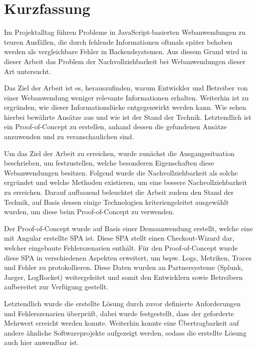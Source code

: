 \section*{\thispagestyle{empty}Kurzfassung}
	
Im Projektalltag führen Probleme in JavaScript-basierten Webanwendungen zu teuren Ausfällen, die durch fehlende Informationen oftmals später behoben werden als vergleichbare Fehler in Backendsystemen. Aus diesem Grund wird in dieser Arbeit das Problem der Nachvollziehbarkeit bei Webanwendungen dieser Art untersucht.
	
Das Ziel der Arbeit ist es, herauszufinden, warum Entwickler und Betreiber von einer Webanwendung weniger relevante Informationen erhalten. Weiterhin ist zu ergründen, wie dieser Informationslücke entgegenwirkt werden kann. Wie sehen hierbei bewährte Ansätze aus und wie ist der Stand der Technik. Letztendlich ist ein Proof-of-Concept zu erstellen, anhand dessen die gefundenen Ansätze anzuwenden und zu veranschaulichen sind.

Um das Ziel der Arbeit zu erreichen, wurde zunächst die Ausgangssituation beschrieben, um festzustellen, welche besonderen Eigenschaften diese Webanwendungen besitzen. Folgend wurde die Nachvollziehbarkeit als solche ergründet und welche Methoden existieren, um eine bessere Nachvollziehbarkeit zu erreichen. Darauf aufbauend beleuchtet die Arbeit zudem den Stand der Technik, auf Basis dessen einige Technologien kriteriengeleitet ausgewählt wurden, um diese beim Proof-of-Concept zu verwenden.

Der Proof-of-Concept wurde auf Basis einer Demoanwendung erstellt, welche eine mit Angular erstellte SPA ist. Diese SPA stellt einen Checkout-Wizard dar, welcher eingebaute Fehlerszenarien enthält. Für den Proof-of-Concept wurde diese SPA in verschiedenen Aspekten erweitert, um bspw. Logs, Metriken, Traces und Fehler zu protokollieren. Diese Daten wurden an Partnersysteme (Splunk, Jaeger, LogRocket) weitergeleitet und somit den Entwicklern sowie Betreibern aufbereitet zur Verfügung gestellt.

Letztendlich wurde die erstellte Lösung durch zuvor definierte Anforderungen und Fehlerszenarien überprüft, dabei wurde festgestellt, dass der geforderte Mehrwert erreicht werden konnte. Weiterhin konnte eine Übertragbarkeit auf andere ähnliche Softwareprojekte aufgezeigt werden, sodass die erstellte Lösung auch hier anwendbar ist.


